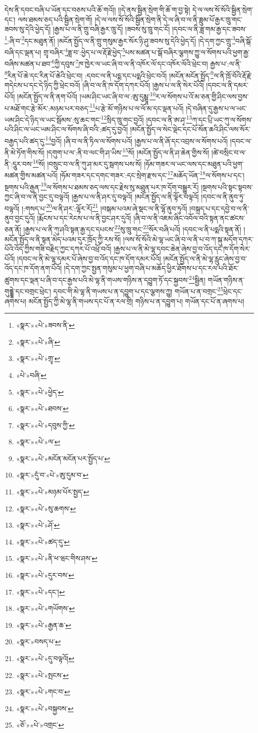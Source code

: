 དེས་ནི་དབང་བཞི་པ་ཡོན་དང་བཅས་པའི་ཆོ་གའོ།། །།དེ་ནས་སྦྱིན་སྲེག་གི་ཆོ་ག་བྱ་སྟེ། དེ་ལ་ལས་སོ་སོའི་སྦྱིན་སྲེག་དང་། ལས་ཐམས་ཅད་པའི་སྦྱིན་སྲེག་གོ། །དེ་ལ་ལས་སོ་སོའི་སྦྱིན་སྲེག་ནི་དེ་ལ་ཞི་བ་ལ་ནི་ཟླུམ་པོ་རྒྱར་ཁྲུ་གང་ཟབས་སུ་དེའི་ཕྱེད་དོ། །རྒྱས་པ་ལ་ནི་གྲུ་བཞི་རྒྱར་ཁྲུ་དོ། །ཟབས་སུ་ཁྲུ་གང་ངོ། །དབང་ལ་ནི་ཟླ་གམ་རྒྱ་དང་ཟབས་\footnote{«སྣར་»«པེ་»ཟབས་ནི་}:ཞི་བ་\footnote{«སྣར་»«པེ་»ཞི་}དང་མཐུན་ནོ། །མངོན་སྤྱོད་ལ་ནི་གྲུ་གསུམ་རྒྱར་སོར་ཉི་ཤུ་ཟབས་སུ་དེའི་ཕྱེད་དོ། །དེ་དག་ཀྱང་གྲུ་\footnote{«སྣར་»«པེ་»གྲྭ་}བཞི་སྒོ་བཞི་དང་ལྡན་པ། གྲྭ་བཞིར་\footnote{«པེ་»བཞི་}ཟླ་བ་:ཕྱེད་པ་ལ་རྡོ་རྗེ་ཕྱེད་\footnote{«སྣར་»«པེ་»ཕྱེད་}པས་མཚན་པ་སྒོ་བཞིར་ལྕགས་ཀྱུ་ལ་སོགས་པའི་ཕྱག་རྒྱ་བཞིས་མཚན་པ་ཐབ་\footnote{«སྣར་»«པེ་»ཐབས་}ཀྱི་དབུས་\footnote{«སྣར་»«པེ་»དབུས་ཀྱི་}ཁ་ཁྱེར་ལ་ཡང་ཞི་བ་ལ་ནི་འཁོར་ལོ་དང་འཁོར་ལོའི་ཕྲེང་བ། རྒྱས་པ་:ལ་ནི་\footnote{«སྣར་»«པེ་»ལ་}རིན་པོ་ཆེ་དང་རིན་པོ་ཆེའི་ཕྲེང་བ། :དབང་ལ་ནི་པདྨ་དང་པདྨའི་ཕྲེང་བའོ། །མངོན་མངོན་སྤྱོད་\footnote{«སྣར་»«པེ་»མངོན་མངོན་པར་སྤྱོད་པ་}ལ་ནི་ཁྲོ་བོའི་རྡོ་རྗེ་གདེངས་པ་དང་དེ་ཉིད་ཀྱི་ཕྲེང་བའོ། །ཞི་བ་ལ་ནི་ཁ་དོག་དཀར་པོའོ། །རྒྱས་པ་ལ་ནི་སེར་པོའོ། །དབང་ལ་ནི་དམར་པོའོ། །མངོན་སྤྱོད་ལ་ནི་ནག་པོའོ། །ཡམ་ཤིང་ཡང་ཞི་བ་ལ་:ཨུ་དུམྺཱ་\footnote{«སྣར་»དུཾ་བ་«པེ་»ཨུ་དུམ་བ་}ར་ལ་སོགས་པ་འོ་མ་ཅན་གྱི་ཤིང་ལས་བྱས་པ་མཐོ་གང་རྩེ་མོར་:མཉམ་པར་བཅད་\footnote{«སྣར་»«པེ་»མཉམ་པོར་སྤྱད་}པ་རྩེ་མོ་གཉིས་པ་ལ་ལོ་མ་དང་ལྡན་པའོ། །དེ་བཞིན་དུ་རྒྱས་པ་ལ་ཡང་ཡམ་ཤིང་དེ་ཉིད་ལ་ཡང་སྦོམས་:སུ་ཆང་གང་\footnote{«སྣར་»«པེ་»སུ་ཆགས་}སྲིད་ཁྲུ་གང་བྱའོ། །དབང་ལ་ནི་ཨ་ཤྭ་\footnote{«སྣར་»«པེ་»ཤོ་}ཀ་དང་པྲི་ཡང་ཀུ་ལ་སོགས་པའི་ཤིང་ལ་ཡང་ཡམ་ཤིང་ལ་སོགས་ཞི་བའི་:ཚད་དུ་བྱའོ། །མངོན་སྤྱོད་ལ་སེང་ལྡེང་དང་པོ་སོན་ཆའི་ཤིང་ལས་སོར་བརྒྱད་པའི་ཚད་དུ་\footnote{«སྣར་»«པེ་»ཚད་དུ་}བྱའོ། །ཞི་བ་ལ་ནི་ཏིལ་ལ་སོགས་པའོ། །རྒྱས་པ་ལ་ནི་ཞོ་དང་འབྲས་ལ་སོགས་པའོ། །དབང་ལ་ནི་མེ་ཏོག་གིས་སོ། །དགུག་པ་ལ་:ནི་བ་ལང་གི་ཤ་ཡིས་\footnote{«སྣར་»«པེ་»ནི་ཕ་ཝང་གིས་ཤས་}སོ། །མངོན་སྤྱོད་ལ་ནི་ཤ་ཆེན་གྱིས་སོ། །ཚེ་བསྲིང་བ་ལ་ནི་:དཱུར་བས་\footnote{«སྣར་»«པེ་»དུར་བས་}སོ། །བསྲུང་བ་ལ་ནི་ཀུ་ཤ་མར་དུ་སྦགས་པས་སོ། །ཧོམ་གཟར་ལ་ཡང་ལས་དང་མཐུན་པའི་ཕྱག་མཚན་གྱིས་མཚན་པའོ། །ཧོམ་གཟར་དང་དགང་གཟར་:དང་སྲེག་རྫས་དང་\footnote{«སྣར་»«པེ་»དང་། }མཆོད་ཡོན་\footnote{«སྣར་»«པེ་»གཡོགས་}ལ་སོགས་པ་དང་། སྔགས་པའི་རྒྱན་\footnote{«སྣར་»«པེ་»རྒྱན་ཆ་}ལ་སོགས་པ་ཐམས་ཅད་ལས་དང་རྗེས་སུ་མཐུན་པར་ཁ་དོག་བསྒྱུར་རོ། །སྔགས་པའི་སྟང་སྟབས་ཀྱང་ཞི་བ་ལ་ནི་བྱང་དུ་བལྟའོ། །རྒྱས་པ་ལ་ནི་ཤར་དུ་བལྟའོ། །མངོན་སྤྱོད་ལ་ནི་ལྟོར་བལྟའོ། །དབང་ལ་ནི་ནུབ་ཏུ་བལྟའོ། །:གསད་པ་\footnote{«སྣར་»བསད་པ་}ལ་ནི་ཤར་:ལྷོར་རོ།\footnote{«སྣར་»«པེ་»དུ་བལྟའོ།} །བསྐམ་པའམ་ཞེ་སྡང་ལ་ནི་ལྷོ་ནུབ་ཏུའོ། །བསྐྲད་པ་དང་དབྱེ་བ་ལ་ནི་ནུབ་བྱང་དུའོ། །རྨོངས་པ་དང་རེངས་པ་ལ་ནི་བྱང་ཤར་དུའོ། །ཞི་བ་ལ་ནི་འཇམ་ཞིང་འབོལ་བའི་སྟན་ནང་ཚངས་ཅན་ནོ། །རྒྱས་པ་ལ་ནི་ཀུ་ཤའི་སྟན་རྒྱ་དང་དཔངས་\footnote{«སྣར་»«པེ་»སྤངས་}སུ་ཁྲུ་གང་\footnote{«སྣར་»«པེ་»གང་བ་}སོར་བཞི་པའོ། །དབང་ལ་ནི་པདྨའི་སྟན་ནོ། །མངོན་སྤྱོད་ལ་ནི་སྟན་མེད་པའམ་དུར་ཁྲོད་ཀྱི་རས་སོ། །ལས་སོ་སོའི་མེ་ལྷ་ཡང་ཞི་བ་ལ་ནི་པ་བ་ཀ་སྐུ་མདོག་དཀར་པོའི་འོད་ཀྱིས་གཟི་བརྗིད་ཀྱང་དཀར་པོ་འཕྲོ་བའོ། །རྒྱས་པ་ལ་ནི་མེ་ལྷ་དབང་ཆེན་ཞེས་བྱ་བ་འོད་དང་ཁ་དོག་སེར་པོའོ། །དབང་ལ་ནི་མེ་ལྷ་དམར་པོ་ཞེས་བྱ་བ་འོད་དང་ཁ་དོག་དམར་པོའོ། །མངོན་སྤྱོད་ལ་ནི་མེ་ལྷ་རླུང་ཞེས་བྱ་བ་འོད་དང་ཁ་དོག་ནག་པོའོ། །དེ་དག་ཀྱང་སྤྱན་གསུམ་པ་ཕྱག་བཞི་པ་མཆོད་ཕྱིར་ཐོགས་པ་དང་རལ་པའི་ཐོར་ཚུགས་དང་ལྡན་པ་ཞི་བ་དང་རྒྱས་པའི་མེ་ལྷ་ནི་གཡས་གཉིས་ན་དབྱུག་ཏོ་དང་སྐྱབས་\footnote{«སྣར་»«པེ་»བསྐྱབས་}སྦྱིན། གཡོན་གཉིས་ན་གུནྡྷེ་དང་བགྲང་ཕྲེང་། དབང་གི་མེ་ལྷ་ནི་གཡས་པ་ན་དབྱུག་པ་དང་ལྕགས་ཀྱུ། གཡོན་པ་ན་བགྲང་\footnote{«ཅོ་»«པེ་»འགྲང་}ཕྲེང་དང་ཞགས་པ། མངོན་སྤྱོད་ཀྱི་མེ་ལྷ་ནི་གཡས་དང་པོ་ན་རལ་གྲི། གཉིས་པ་ན་དབྱུག་པ། གཡོན་དང་པོ་ན་ཞགས་པ། 